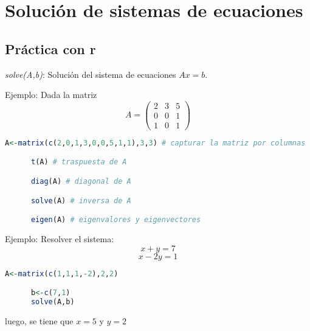 \section{Solución de sistemas de ecuaciones}


\subsection{Práctica con r}

 \textit{solve(A,b)}: Solución del sistema de ecuaciones $Ax=b$.

Ejemplo: Dada la matriz 
$$
A=\left(
\begin{matrix}
2 & 3 & 5\\ 
0 & 0 & 1\\
1 & 0 & 1
\end{matrix}
\right) 
$$

\begin{lstlisting}[language=R]
      A<-matrix(c(2,0,1,3,0,0,5,1,1),3,3) # capturar la matriz por columnas

      t(A) # traspuesta de A

      diag(A) # diagonal de A

      solve(A) # inversa de A

      eigen(A) # eigenvalores y eigenvectores
\end{lstlisting}

Ejemplo: Resolver el sistema: 
$$
x+y=7 
$$
$$
x-2y=1
$$

\begin{lstlisting}[language=R]
      A<-matrix(c(1,1,1,-2),2,2)

      b<-c(7,1)
      solve(A,b)
\end{lstlisting}

luego, se tiene que $x=5$ y $y=2$

